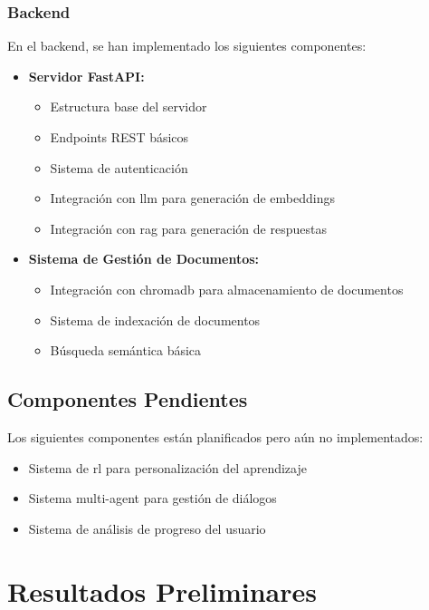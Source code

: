 \subsubsection{Backend}

En el backend, se han implementado los siguientes componentes:

\begin{itemize}
    \item \textbf{Servidor FastAPI:}
    \begin{itemize}
        \item Estructura base del servidor
        \item Endpoints REST básicos
        \item Sistema de autenticación
        \item Integración con \gls{llm} para generación de embeddings
        \item Integración con \gls{rag} para generación de respuestas
    \end{itemize}

    \item \textbf{Sistema de Gestión de Documentos:}
    \begin{itemize}
        \item Integración con \gls{chromadb} para almacenamiento de documentos
        \item Sistema de indexación de documentos
        \item Búsqueda semántica básica
    \end{itemize}
\end{itemize}

\subsection{Componentes Pendientes}
\label{componentes-pendientes}

Los siguientes componentes están planificados pero aún no implementados:

\begin{itemize}
    \item Sistema de \gls{rl} para personalización del aprendizaje
    \item Sistema \gls{multi-agent} para gestión de diálogos
    \item Sistema de análisis de progreso del usuario    
\end{itemize}

\section{Resultados Preliminares}
\label{resultados-preliminares}


